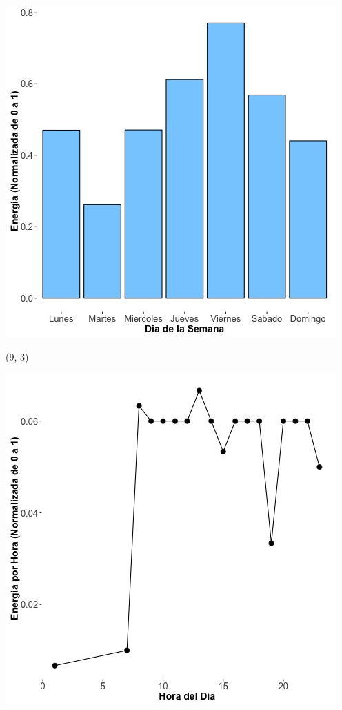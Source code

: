 \documentclass{article}\usepackage[]{graphicx}\usepackage[]{color}
\newenvironment{knitrout}{}{} %
\begin{document}
\begin{knitrout}
\color{fgcolor}
\includegraphics[scale=0.65]{figure/A21_day_of_week_plot} 
\end{knitrout}


 \begin{textblock}{1}(9,-3)
\begin{minipage}{20em}
\begingroup

\endgroup
\end{minipage}
\end{textblock}

 \vspace{2cm}

\begin{knitrout}
\color{fgcolor}
\includegraphics[scale=0.75]{figure/A21_fplot_norm_median} 
\end{knitrout}
\end{document}
